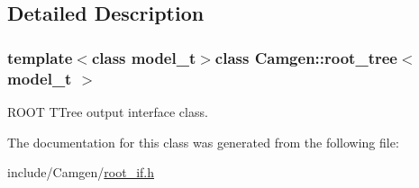 \subsection{Detailed Description}
\subsubsection*{template$<$class model\+\_\+t$>$class Camgen\+::root\+\_\+tree$<$ model\+\_\+t $>$}

R\+O\+O\+T T\+Tree output interface class. 

The documentation for this class was generated from the following file\+:\begin{DoxyCompactItemize}
\item 
include/\+Camgen/\hyperlink{a00760}{root\+\_\+if.\+h}\end{DoxyCompactItemize}
